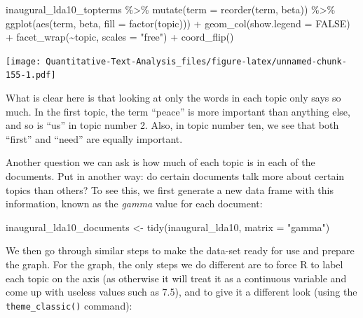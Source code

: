 \documentclass[
]{book}
\newenvironment{Shaded}{\begin{snugshade}}{\end{snugshade}}
\newcommand{\AttributeTok}[1]{\textcolor[rgb]{0.77,0.63,0.00}{#1}}
\newcommand{\ConstantTok}[1]{\textcolor[rgb]{0.00,0.00,0.00}{#1}}
\newcommand{\FunctionTok}[1]{\textcolor[rgb]{0.00,0.00,0.00}{#1}}
\newcommand{\NormalTok}[1]{#1}
\newcommand{\OtherTok}[1]{\textcolor[rgb]{0.56,0.35,0.01}{#1}}
\newcommand{\SpecialCharTok}[1]{\textcolor[rgb]{0.00,0.00,0.00}{#1}}
\newcommand{\StringTok}[1]{\textcolor[rgb]{0.31,0.60,0.02}{#1}}
\begin{document}
\begin{Shaded}
\begin{Highlighting}[]
\NormalTok{inaugural\_lda10\_topterms }\SpecialCharTok{\%\textgreater{}\%}
    \FunctionTok{mutate}\NormalTok{(}\AttributeTok{term =} \FunctionTok{reorder}\NormalTok{(term, beta)) }\SpecialCharTok{\%\textgreater{}\%}
    \FunctionTok{ggplot}\NormalTok{(}\FunctionTok{aes}\NormalTok{(term, beta, }\AttributeTok{fill =} \FunctionTok{factor}\NormalTok{(topic))) }\SpecialCharTok{+} \FunctionTok{geom\_col}\NormalTok{(}\AttributeTok{show.legend =} \ConstantTok{FALSE}\NormalTok{) }\SpecialCharTok{+}
    \FunctionTok{facet\_wrap}\NormalTok{(}\SpecialCharTok{\textasciitilde{}}\NormalTok{topic, }\AttributeTok{scales =} \StringTok{"free"}\NormalTok{) }\SpecialCharTok{+} \FunctionTok{coord\_flip}\NormalTok{()}
\end{Highlighting}
\end{Shaded}

\texttt{[image: Quantitative-Text-Analysis\_files/figure-latex/unnamed-chunk-155-1.pdf]}

What is clear here is that looking at only the words in each topic only says so much. In the first topic, the term ``peace'' is more important than anything else, and so is ``us'' in topic number 2. Also, in topic number ten, we see that both ``first'' and ``need'' are equally important.

Another question we can ask is how much of each topic is in each of the documents. Put in another way: do certain documents talk more about certain topics than others? To see this, we first generate a new data frame with this information, known as the \emph{gamma} value for each document:

\begin{Shaded}
\begin{Highlighting}[]
\NormalTok{inaugural\_lda10\_documents }\OtherTok{\textless{}{-}} \FunctionTok{tidy}\NormalTok{(inaugural\_lda10, }\AttributeTok{matrix =} \StringTok{"gamma"}\NormalTok{)}
\end{Highlighting}
\end{Shaded}

We then go through similar steps to make the data-set ready for use and prepare the graph. For the graph, the only steps we do different are to force R to label each topic on the axis (as otherwise it will treat it as a continuous variable and come up with useless values such as 7.5), and to give it a different look (using the \texttt{theme\_classic()} command):
\end{document}
